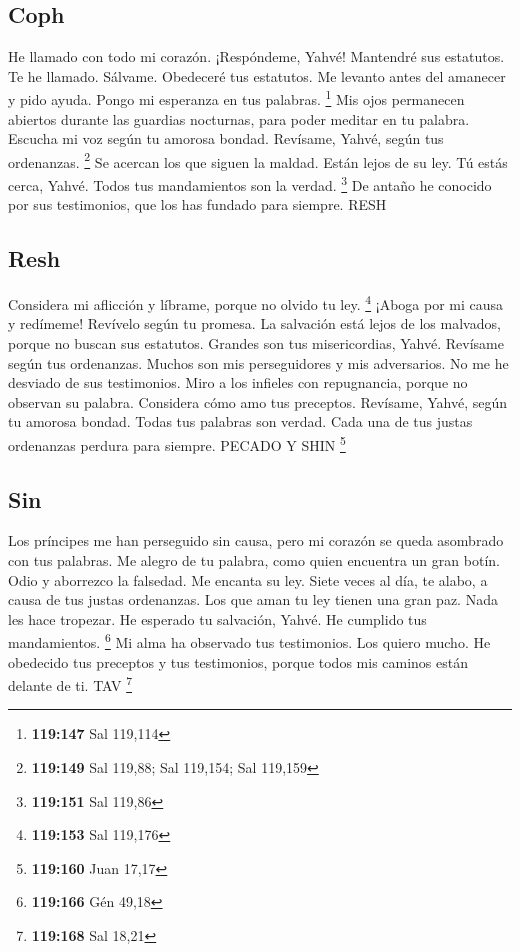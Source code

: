 \begin{paracol}{2}
\hypertarget{coph}{%
\subsection{Coph}\label{coph}}

 He llamado con todo mi corazón. ¡Respóndeme, Yahvé!
Mantendré sus estatutos.  Te he llamado. Sálvame.
Obedeceré tus estatutos.  Me levanto antes del amanecer
y pido ayuda. Pongo mi esperanza en tus palabras. \footnote{\textbf{119:147}
  Sal 119,114}  Mis ojos permanecen abiertos durante las
guardias nocturnas, para poder meditar en tu palabra. 
Escucha mi voz según tu amorosa bondad. Revísame, Yahvé, según tus
ordenanzas. \footnote{\textbf{119:149} Sal 119,88; Sal 119,154; Sal
  119,159}  Se acercan los que siguen la maldad. Están
lejos de su ley.  Tú estás cerca, Yahvé. Todos tus
mandamientos son la verdad. \footnote{\textbf{119:151} Sal 119,86}
 De antaño he conocido por sus testimonios, que los has
fundado para siempre. RESH

\hypertarget{resh}{%
\subsection{Resh}\label{resh}}

 Considera mi aflicción y líbrame, porque no olvido tu
ley. \footnote{\textbf{119:153} Sal 119,176}  ¡Aboga por
mi causa y redímeme! Revívelo según tu promesa.  La
salvación está lejos de los malvados, porque no buscan sus estatutos.
 Grandes son tus misericordias, Yahvé. Revísame según
tus ordenanzas.  Muchos son mis perseguidores y mis
adversarios. No me he desviado de sus testimonios.  Miro
a los infieles con repugnancia, porque no observan su palabra.
 Considera cómo amo tus preceptos. Revísame, Yahvé,
según tu amorosa bondad.  Todas tus palabras son verdad.
Cada una de tus justas ordenanzas perdura para siempre. PECADO Y SHIN
\footnote{\textbf{119:160} Juan 17,17}

\hypertarget{sin}{%
\subsection{Sin}\label{sin}}

 Los príncipes me han perseguido sin causa, pero mi
corazón se queda asombrado con tus palabras.  Me alegro
de tu palabra, como quien encuentra un gran botín.  Odio
y aborrezco la falsedad. Me encanta su ley.  Siete veces
al día, te alabo, a causa de tus justas ordenanzas.  Los
que aman tu ley tienen una gran paz. Nada les hace tropezar.
 He esperado tu salvación, Yahvé. He cumplido tus
mandamientos. \footnote{\textbf{119:166} Gén 49,18}  Mi
alma ha observado tus testimonios. Los quiero mucho.  He
obedecido tus preceptos y tus testimonios, porque todos mis caminos
están delante de ti. TAV \footnote{\textbf{119:168} Sal 18,21}


\end{paracol}
